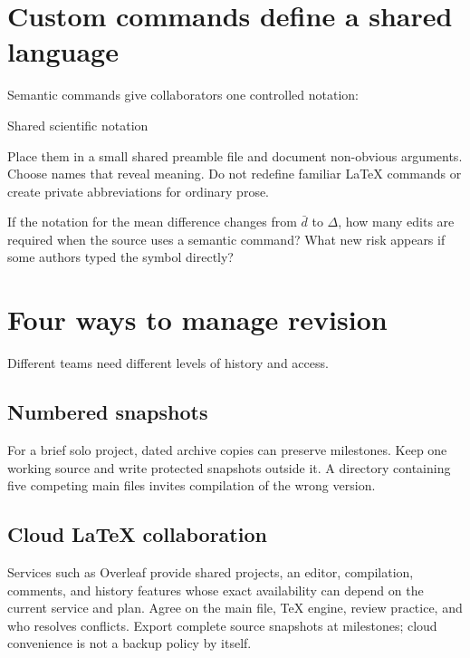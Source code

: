 \section{Custom commands define a shared language}

Semantic commands give collaborators one controlled notation:

\begin{latexcode}{Shared scientific notation}
\newcommand{\MeanDifference}{\ensuremath{\bar d}}
\newcommand{\MethodA}{\textsc{Method A}}
\end{latexcode}

Place them in a small shared preamble file and document non-obvious arguments.
Choose names that reveal meaning. Do not redefine familiar \LaTeX{} commands or
create private abbreviations for ordinary prose.

\begin{pausepredict}
If the notation for the mean difference changes from $\bar d$ to $\Delta$, how
many edits are required when the source uses a semantic command? What new risk
appears if some authors typed the symbol directly?
\end{pausepredict}

\section{Four ways to manage revision}

Different teams need different levels of history and access.

\subsection{Numbered snapshots}

For a brief solo project, dated archive copies can preserve milestones. Keep one
working source and write protected snapshots outside it. A directory containing
five competing main files invites compilation of the wrong version.

\subsection{Cloud \LaTeX{} collaboration}

Services such as Overleaf provide shared projects, an editor, compilation,
comments, and history features whose exact availability can depend on the
current service and plan. Agree on the main file, TeX engine, review practice,
and who resolves conflicts. Export complete source snapshots at milestones;
cloud convenience is not a backup policy by itself.

